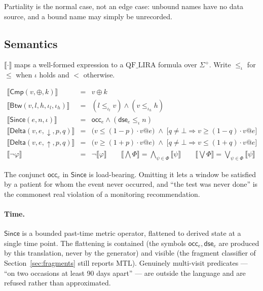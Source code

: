Partiality is the normal case, not an edge case: unbound names have no data
source, and a bound name may simply be unrecorded.

\subsection{Semantics}

$\llbracket\cdot\rrbracket$ maps a well-formed expression to a
$\mathrm{QF\_LIRA}$ formula over $\Sigma^{+}$. Write $\le_\iota$ for $\le$ when
$\iota$ holds and $<$ otherwise.

\[
\begin{array}{rcl}
  \llbracket \mathsf{Cmp}(v,\oplus,k) \rrbracket
    &=& v \oplus k \\[2pt]
  \llbracket \mathsf{Btw}(v,l,h,\iota_l,\iota_h) \rrbracket
    &=& (l \le_{\iota_l} v) \wedge (v \le_{\iota_h} h) \\[2pt]
  \llbracket \mathsf{Since}(e,n,\iota) \rrbracket
    &=& \mathsf{occ}_e \wedge (\mathsf{dse}_e \le_\iota n) \\[2pt]
  \llbracket \mathsf{Delta}(v,e,\downarrow,p,q) \rrbracket
    &=& \bigl(v \le (1-p)\cdot v@e\bigr)
        \;\wedge\; \bigl[q \neq \bot \Rightarrow v \ge (1-q)\cdot v@e\bigr] \\[2pt]
  \llbracket \mathsf{Delta}(v,e,\uparrow,p,q) \rrbracket
    &=& \bigl(v \ge (1+p)\cdot v@e\bigr)
        \;\wedge\; \bigl[q \neq \bot \Rightarrow v \le (1+q)\cdot v@e\bigr] \\[2pt]
  \llbracket \neg\varphi \rrbracket &=& \neg \llbracket \varphi \rrbracket
  \qquad
  \llbracket \textstyle\bigwedge\Phi \rrbracket = \bigwedge_{\psi\in\Phi} \llbracket \psi \rrbracket
  \qquad
  \llbracket \textstyle\bigvee\Phi \rrbracket = \bigvee_{\psi\in\Phi} \llbracket \psi \rrbracket
\end{array}
\]

The conjunct $\mathsf{occ}_e$ in $\mathsf{Since}$ is load-bearing. Omitting it
lets a window be satisfied by a patient for whom the event never occurred, and
``the test was never done'' is the commonest real violation of a monitoring
recommendation.

\paragraph{Time.} $\mathsf{Since}$ is a bounded past-time metric operator,
flattened to derived state at a single time point. The flattening is contained
(the symbols $\mathsf{occ}_e, \mathsf{dse}_e$ are produced by this translation,
never by the generator) and visible (the fragment classifier of
Section~\ref{sec:fragments} still reports $\mathrm{MTL}$). Genuinely multi-visit
predicates --- ``on two occasions at least 90 days apart'' --- are outside the
language and are refused rather than approximated.

